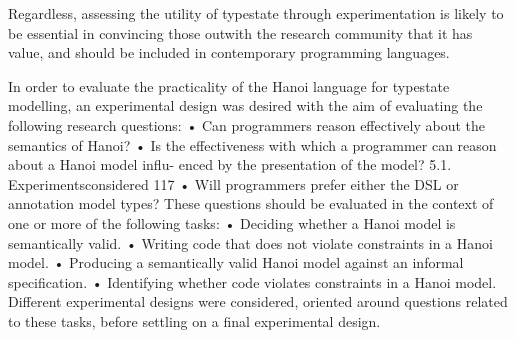 


Regardless, assessing the utility of typestate through experimentation is likely to be essential in convincing those outwith the research community that it has value, and should be included in contemporary programming languages.


In order to evaluate the practicality of the Hanoi language for typestate modelling, an experimental design was desired with the aim of evaluating the following research questions:
• Can programmers reason effectively about the semantics of Hanoi?
• Is the effectiveness with which a programmer can reason about a Hanoi model influ- enced by the presentation of the model?
5.1. Experimentsconsidered 117
 • Will programmers prefer either the DSL or annotation model types?
These questions should be evaluated in the context of one or more of the following tasks:
• Deciding whether a Hanoi model is semantically valid.
• Writing code that does not violate constraints in a Hanoi model.
• Producing a semantically valid Hanoi model against an informal specification. • Identifying whether code violates constraints in a Hanoi model.
Different experimental designs were considered, oriented around questions related to these tasks, before settling on a final experimental design.


